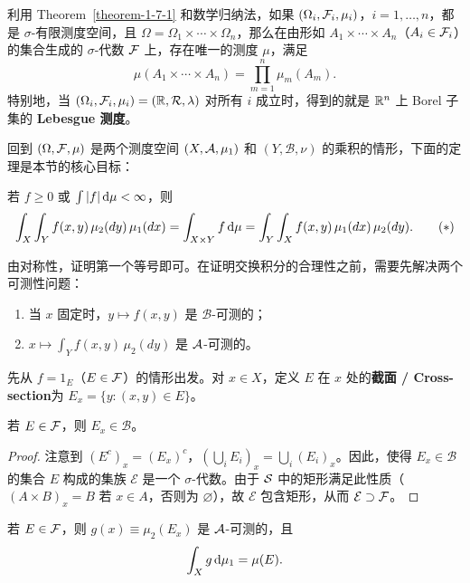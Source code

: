 利用 Theorem~\ref{theorem-1-7-1} 和数学归纳法，如果 $(\Omega_i, \mathcal{F}_i, \mu_i)$，$i = 1, \ldots, n$，都是 $\sigma$-有限测度空间，且 $\Omega = \Omega_1 \times \cdots \times \Omega_n$，那么在由形如 $A_1 \times \cdots \times A_n$（$A_i \in \mathcal{F}_i$）的集合生成的 $\sigma$-代数 $\mathcal{F}$ 上，存在唯一的测度 $\mu$，满足
\[
    \mu(A_1 \times \cdots \times A_n) = \prod_{m=1}^n \mu_m(A_m).
\]
特别地，当 $(\Omega_i, \mathcal{F}_i, \mu_i) = (\mathbb{R}, \mathcal{R}, \lambda)$ 对所有 $i$ 成立时，得到的就是 $\mathbb{R}^n$ 上 Borel 子集的 \textbf{Lebesgue 测度}。

\medskip

回到 $(\Omega, \mathcal{F}, \mu)$ 是两个测度空间 $(X, \mathcal{A}, \mu_1)$ 和 $(Y, \mathcal{B}, \nu)$ 的乘积的情形，下面的定理是本节的核心目标：

\begin{theorem}\label{theorem-1-7-2}
    若 $f \ge 0$ 或 $\int |f| \,\mathrm{d}\mu < \infty$，则
    \[
        \int_X \int_Y f(x,y)\,\mu_2(dy)\,\mu_1(dx)
        = \int_{X \times Y} f \,\mathrm{d}\mu
        = \int_Y \int_X f(x,y)\,\mu_1(dx)\,\mu_2(dy). \tag{$\ast$}
    \]
\end{theorem}

由对称性，证明第一个等号即可。在证明交换积分的合理性之前，需要先解决两个可测性问题：
\begin{enumerate}
    \item 当 $x$ 固定时，$y \mapsto f(x,y)$ 是 $\mathcal{B}$-可测的；
    \item $x \mapsto \int_Y f(x,y)\,\mu_2(dy)$ 是 $\mathcal{A}$-可测的。
\end{enumerate}

先从 $f = 1_E$（$E \in \mathcal{F}$）的情形出发。对 $x \in X$，定义 $E$ 在 $x$ 处的{\normalfont\bfseries 截面 / Cross-section}为 $E_x = \{y : (x,y) \in E\}$。

\begin{lemma}\label{lemma-1-7-3}
    若 $E \in \mathcal{F}$，则 $E_x \in \mathcal{B}$。
\end{lemma}

\begin{proof}
    注意到 $(E^c)_x = (E_x)^c$，$(\bigcup_i E_i)_x = \bigcup_i (E_i)_x$。因此，使得 $E_x \in \mathcal{B}$ 的集合 $E$ 构成的集族 $\mathcal{E}$ 是一个 $\sigma$-代数。由于 $\mathcal{S}$ 中的矩形满足此性质（$(A \times B)_x = B$ 若 $x \in A$，否则为 $\varnothing$），故 $\mathcal{E}$ 包含矩形，从而 $\mathcal{E} \supset \mathcal{F}$。
\end{proof}

\begin{lemma}\label{lemma-1-7-4}
    若 $E \in \mathcal{F}$，则 $g(x) \equiv \mu_2(E_x)$ 是 $\mathcal{A}$-可测的，且
    \[
        \int_X g \,\mathrm{d}\mu_1 = \mu(E).
    \]
\end{lemma}

